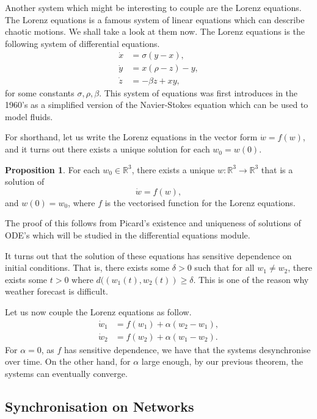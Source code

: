 \documentclass[
]{article}
\theoremstyle{definition}
\newtheorem{prop}{Proposition}[theorem]
\theoremstyle{definition}
\begin{document}
Another system which might be interesting to couple are the Lorenz
equations. The Lorenz equations is a famous system of linear equations
which can describe chaotic motions. We shall take a look at them now.
The Lorenz equations is the following system of differential equations.
\begin{align*}
  \dot x & = \sigma (y - x),\\
  \dot y & = x(\rho - z) - y,\\
  \dot z & = - \beta z + xy,
\end{align*} for some constants \(\sigma, \rho, \beta\). This system of
equations was first introduces in the 1960's as a simplified version of
the Navier-Stokes equation which can be used to model fluids.

For shorthand, let us write the Lorenz equations in the vector form
\(\dot w = f(w)\), and it turns out there exists a unique solution for
each \(w_0 = w(0)\).

\begin{prop}
  For each \(w_0 \in \mathbb{R}^3\), there exists a unique 
  \(w : \mathbb{R}^3 \to \mathbb{R}^3\) that is a solution of 
  \[\dot w = f(w),\]
  and \(w(0) = w_0\), where \(f\) is the vectorised function for the Lorenz 
  equations.
\end{prop}

The proof of this follows from Picard's existence and uniqueness of
solutions of ODE's which will be studied in the differential equations
module.

It turns out that the solution of these equations has sensitive
dependence on initial conditions. That is, there exists some
\(\delta > 0\) such that for all \(w_1 \neq w_2\), there exists some
\(t > 0\) where \(d((w_1(t), w_2(t)) \ge \delta\). This is one of the
reason why weather forecast is difficult.

Let us now couple the Lorenz equations as follow. \begin{align*}
  \dot w_1 & = f(w_1) + \alpha(w_2 - w_1),\\
  \dot w_2 & = f(w_2) + \alpha(w_1 - w_2).
\end{align*} For \(\alpha = 0\), as \(f\) has sensitive dependence, we
have that the systems desynchronise over time. On the other hand, for
\(\alpha\) large enough, by our previous theorem, the systems can
eventually converge.

\hypertarget{synchronisation-on-networks}{%
\subsection{Synchronisation on
Networks}\label{synchronisation-on-networks}}
\end{document}

